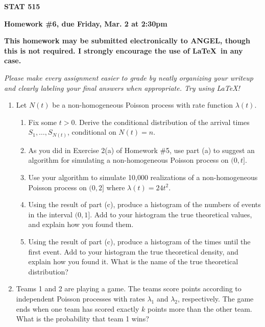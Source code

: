 \documentclass{article}
\begin{document}
\begin{center}
{\bf STAT 515}

{\bf Homework \#6, due Friday, Mar. 2 at 2:30pm}

{\bf This homework may be submitted electronically to ANGEL, though this is not
required. I strongly encourage the use of \LaTeX\ in any case.}

\end{center}

{\it Please make every assignment easier to grade by neatly organizing your
writeup and clearly labeling your final answers when appropriate. Try using
\LaTeX!}


\begin{enumerate}

\item Let $N(t)$ be a non-homogeneous Poisson process with rate function
$\lambda(t)$.

  \begin{enumerate}

  \item Fix some $t>0$. Derive the conditional distribution of the arrival times
  $S_1, \ldots, S_{N(t)}$, conditional on $N(t)=n$.

  \item As you did in Exercise 2(a) of Homework \#5, use part (a) to suggest an
  algorithm for simulating a non-homogeneous Poisson process on $(0, t]$.

  \item Use your algorithm to simulate 10,000 realizations of a non-homogeneous
  Poisson process on $(0, 2]$ where $\lambda(t) = 24t^2$.

  \item Using the result of part (c), produce a histogram of the numbers of
  events in the interval $(0, 1]$. Add to your histogram the true theoretical
  values, and explain how you found them.

  \item Using the result of part (c), produce a histogram of the times until the
  first event. Add to your histogram the true theoretical density, and explain
  how you found it. What is the name of the true theoretical distribution?

  \end{enumerate}  

\item Teams 1 and 2 are playing a game. The teams score points according to
independent Poisson processes with rates $\lambda_1$ and $\lambda_2$,
respectively. The game ends when one team has scored exactly $k$ points more
than the other team. What is the probability that team 1 wins?


\end{enumerate}
\end{document}
